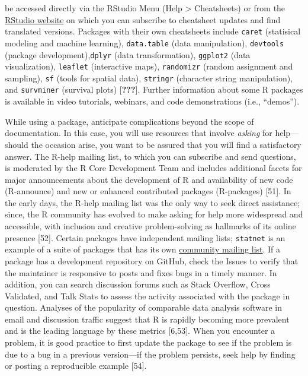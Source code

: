 \documentclass[10pt,letterpaper]{article}
\begin{document}
be accessed directly via the RStudio Menu (Help \textgreater{}
Cheatsheets) or from the
\href{https://rstudio.com/resources/cheatsheets/}{RStudio website} on
which you can subscribe to cheatsheet updates and find translated
versions. Packages with their own cheatsheets include \texttt{caret}
(statisical modeling and machine learning), \texttt{data.table} (data
manipulation), \texttt{devtools} (package development),\texttt{dplyr}
(data transformation), \texttt{ggplot2} (data visualization),
\texttt{leaflet} (interactive maps), \texttt{randomizr} (random
assignment and sampling), \texttt{sf} (tools for spatial data),
\texttt{stringr} (character string manipulation), and \texttt{survminer}
(survival plots) {[}{\textbf{???}}{]}. Further information about some R
packages is available in video tutorials, webinars, and code
demonstrations (i.e., ``demos'').

While using a package, anticipate complications beyond the scope of
documentation. In this case, you will use resources that involve
\emph{asking} for help---should the occasion arise, you want to be
assured that you will find a satisfactory answer. The R-help mailing
list, to which you can subscribe and send questions, is moderated by the
R Core Development Team and includes additional facets for major
announcements about the development of R and availability of new code
(R-announce) and new or enhanced contributed packages (R-packages)
{[}51{]}. In the early days, the R-help mailing list was the only way to
seek direct assistance; since, the R community has evolved to make
asking for help more widespread and accessible, with inclusion and
creative problem-solving as hallmarks of its online presence {[}52{]}.
Certain packages have independent mailing lists; \texttt{statnet} is an
example of a suite of packages that has its own
\href{http://statnet.org/}{community mailing list}. If a package has a
development repository on GitHub, check the Issues to verify that the
maintainer is responsive to posts and fixes bugs in a timely manner. In
addition, you can search discussion forums such as Stack Overflow, Cross
Validated, and Talk Stats to assess the activity associated with the
package in question. Analyses of the popularity of comparable data
analysis software in email and discussion traffic suggest that R is
rapidly becoming more prevalent and is the leading language by these
metrics {[}6,53{]}. When you encounter a problem, it is good practice to
first update the package to see if the problem is due to a bug in a
previous version---if the problem persists, seek help by finding or
posting a reproducible example {[}54{]}.
\end{document}
